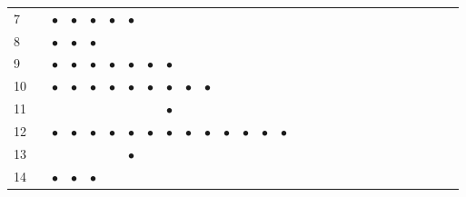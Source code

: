 \documentclass[text.tex]{subfiles}
\begin{document}
\begin{table}
{\begin{tabular}{l|ccccccccccccccccccccccccccc}
7   &           & $\bullet$ & $\bullet$ & $\bullet$ & $\bullet$ & $\bullet$ &           &           &           &           &           &           &           &           &           &           &           &           &           &           &           &           &           &           &           &           &           \\
8   &           & $\bullet$ & $\bullet$ & $\bullet$ &           &           &           &           &           &           &           &           &           &           &           &           &           &           &           &           &           &           &           &           &           &           &           \\
9   &           & $\bullet$ & $\bullet$ & $\bullet$ & $\bullet$ & $\bullet$ & $\bullet$ & $\bullet$ &           &           &           &           &           &           &           &           &           &           &           &           &           &           &           &           &           &           &           \\
10  &           & $\bullet$ & $\bullet$ & $\bullet$ & $\bullet$ & $\bullet$ & $\bullet$ & $\bullet$ & $\bullet$ & $\bullet$ &           &           &           &           &           &           &           &           &           &           &           &           &           &           &           &           &           \\
11  &           &           &           &           &           &           &           & $\bullet$ &           &           &           &           &           &           &           &           &           &           &           &           &           &           &           &           &           &           &           \\
12  &           & $\bullet$ & $\bullet$ & $\bullet$ & $\bullet$ & $\bullet$ & $\bullet$ & $\bullet$ & $\bullet$ & $\bullet$ & $\bullet$ & $\bullet$ & $\bullet$ & $\bullet$ &           &           &           &           &           &           &           &           &           &           &           &           &           \\
13  &           &           &           &           &           & $\bullet$ &           &           &           &           &           &           &           &           &           &           &           &           &           &           &           &           &           &           &           &           &           \\
14  &           & $\bullet$ & $\bullet$ & $\bullet$ &           &           &           &           &           &           &           &           &           &           &           &           &           &           &           &           &           &           &           &           &           &           &           \\

\end{tabular}}
\end{table}
\end{document}
